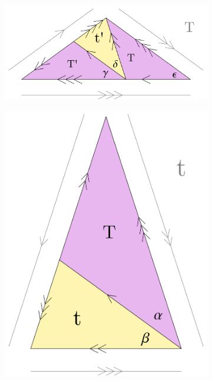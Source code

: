 \documentclass[
  oneside,
  11pt, a4paper,
  footinclude=true,
  headinclude=true,
  cleardoublepage=empty
]{scrbook}
\begin{document}
\begin{figure}[H]
        \begin{subfigure}[t]{0.55\textwidth}
                \includegraphics[width=\textwidth]{TF}
        \end{subfigure}\hfill
        \begin{subfigure}[t]{0.35\textwidth}
                \includegraphics[width=\textwidth]{TS}
        \end{subfigure}\\
        

\end{figure}
\end{document}
